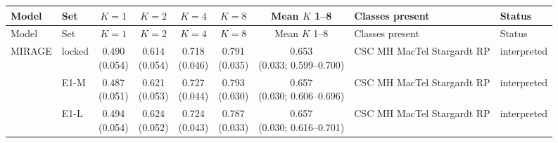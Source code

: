 \begin{longtable}{@{}p{3.2cm}lcccccp{2.4cm}p{2.2cm}@{}}
\toprule
Model & Set & $K=1$ & $K=2$ & $K=4$ & $K=8$ & Mean $K$ 1--8 & Classes present & Status \\
\midrule
\endfirsthead
\toprule
Model & Set & $K=1$ & $K=2$ & $K=4$ & $K=8$ & Mean $K$ 1--8 & Classes present & Status \\
\midrule
\endhead
\bottomrule
\endfoot
\bottomrule
\endlastfoot
MIRAGE & locked & \makecell{0.490\\{\scriptsize (0.054)}} & \makecell{0.614\\{\scriptsize (0.054)}} & \makecell{0.718\\{\scriptsize (0.046)}} & \makecell{0.791\\{\scriptsize (0.035)}} & \makecell{0.653\\{\scriptsize (0.033; 0.599--0.700)}} & CSC MH MacTel Stargardt RP & interpreted \\
 & E1-M & \makecell{0.487\\{\scriptsize (0.051)}} & \makecell{0.621\\{\scriptsize (0.053)}} & \makecell{0.727\\{\scriptsize (0.044)}} & \makecell{0.793\\{\scriptsize (0.030)}} & \makecell{0.657\\{\scriptsize (0.030; 0.606--0.696)}} & CSC MH MacTel Stargardt RP & interpreted \\
 & E1-L & \makecell{0.494\\{\scriptsize (0.054)}} & \makecell{0.624\\{\scriptsize (0.052)}} & \makecell{0.724\\{\scriptsize (0.043)}} & \makecell{0.787\\{\scriptsize (0.033)}} & \makecell{0.657\\{\scriptsize (0.030; 0.616--0.701)}} & CSC MH MacTel Stargardt RP & interpreted \\

\end{longtable}
